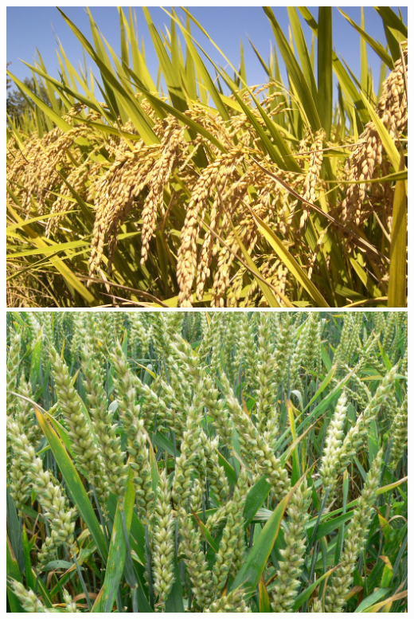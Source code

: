 \begin{frame}
\begin{center}
    \includegraphics[height=0.15\textheight]{images/Rice_Plants_(IRRI)}
    \includegraphics[height=0.15\textheight]{images/Wheat_P1210892}
  \end{center}  		
\end{frame}

